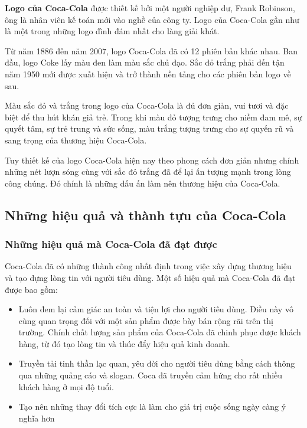 \documentclass{article}
\begin{document}
    \vspace{0.2cm}
    \textbf{Logo của Coca-Cola} được thiết kế bởi một người nghiệp dư, Frank Robinson, ông là nhân viên kế toán mới vào nghề của công ty. Logo của Coca-Cola gần như là một trong những logo đình đám nhất cho làng giải khát.

    \vspace{0.2cm}
    Từ năm 1886 đến năm 2007, logo Coca-Cola đã có 12 phiên bản khác nhau. Ban đầu, logo Coke lấy màu đen làm màu sắc chủ đạo. Sắc đỏ trắng phải đến tận năm 1950 mới được xuất hiện và trở thành nền tảng cho các phiên bản logo về sau.

    \vspace{0.2cm}
    Màu sắc đỏ và trắng trong logo của Coca-Cola là đủ đơn giản, vui tươi và đặc biệt để thu hút khán giả trẻ. Trong khi màu đỏ tượng trưng cho niềm đam mê, sự quyết tâm, sự trẻ trung và sức sống, màu trắng tượng trưng cho sự quyến rũ và sang trọng của thương hiệu Coca-Cola.

    \vspace{0.2cm}
    Tuy thiết kế của logo Coca-Cola hiện nay theo phong cách đơn giản nhưng chính những nét lượn sóng cùng với sắc đỏ trắng đã để lại ấn tượng mạnh trong lòng công chúng. Đó chính là những dấu ấn làm nên thương hiệu của Coca-Cola.

\subsection{Những hiệu quả và thành tựu của Coca-Cola}
    \subsubsection{Những hiệu quả mà Coca-Cola đã đạt được}
    \vspace{0.2cm}
    Coca-Cola đã có những thành công nhất định trong việc xây dựng thương hiệu và tạo dựng lòng tin với người tiêu dùng. Một số hiệu quả mà Coca-Cola đã đạt được bao gồm:
    \begin{itemize}
        \item Luôn đem lại cảm giác an toàn và tiện lợi cho người tiêu dùng. Điều này vô cùng quan trọng đối với một sản phẩm được bày bán rộng rãi trên thị trường. Chính chất lượng sản phẩm của Coca-Cola đã chinh phục được khách hàng, từ đó tạo lòng tin và thúc đẩy hiệu quả kinh doanh.
        \item Truyền tải tinh thần lạc quan, yêu đời cho người tiêu dùng bằng cách thông qua những quảng cáo và slogan. Coca đã truyền cảm hứng cho rất nhiều khách hàng ở mọi độ tuổi.
        \item Tạo nên những thay đổi tích cực là làm cho giá trị cuộc sống ngày càng ý nghĩa hơn
    \end{itemize}
\end{document}
